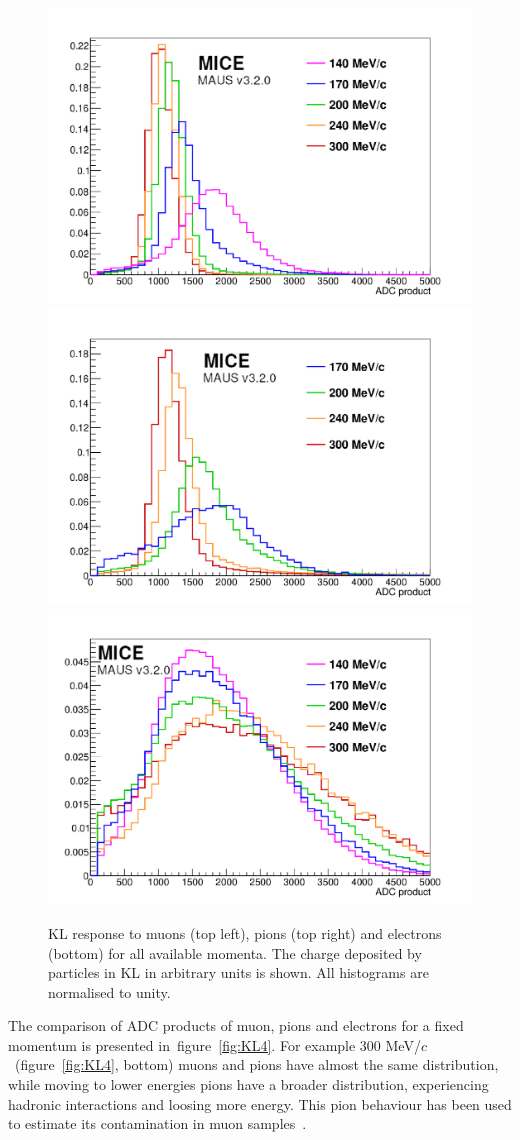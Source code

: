   \begin{figure}[htb!]
	\begin{center}
  		\includegraphics[width=0.49\columnwidth]{./04-KL/Figures/muon.pdf}
  		\includegraphics[width=0.49\columnwidth]{./04-KL/Figures/pion.pdf}
  		\includegraphics[width=0.49\columnwidth]{./04-KL/Figures/electron.pdf}
  		\caption{KL response to muons (top left), pions (top right) and electrons (bottom) for all available momenta. The charge deposited by particles in KL in arbitrary units is shown. All histograms are normalised to unity.}
  		\label{fig:KL3}
  	\end{center}
  \end{figure}
  
The comparison of ADC products of muon, pions and electrons for a fixed momentum is presented in~figure~\ref{fig:KL4}. 
For example 300 MeV/$c$~(figure~\ref{fig:KL4}, bottom) muons and pions have almost the same distribution, while moving to lower energies pions have a broader distribution, experiencing hadronic interactions and loosing more energy.
This pion behaviour has been used to estimate its contamination in muon samples~\cite{2016JInst..11P3001A}. 


